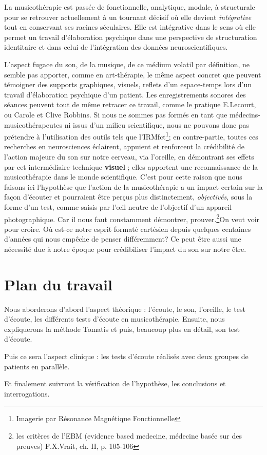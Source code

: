  La musicothérapie est passée de fonctionnelle, analytique, mo\-da\-le,  à struc\-tu\-rale pour se retrouver actuellement 
 à un tournant décisif où elle devient 
 \emph{intégrative} tout en conservant ses racines séculaires. Elle est intégrative dans le sens où elle permet un travail d'élaboration psychique dans une perspective de structuration identitaire \autocite[ch. III, p. 53, 105]{vrait_musicotherapie_2018} et dans celui de l'intégration des données neuroscientifiques.
 
  
L'aspect fugace du son, de la musique, de ce médium volatil par
définition, ne semble pas apporter, comme en art-thérapie, le
même aspect concret que peuvent témoigner des supports graphiques,
visuels, reflets d'un espace-temps lors d'un travail d'élaboration
psychique d'un patient. Les enregistrements sonores des séances peuvent tout de même retracer ce travail, comme le pratique E.Lecourt, ou Carole et Clive Robbins.
Si nous ne sommes pas formés en tant que médecins- musicothérapeutes ni issus d'un milieu scientifique, nous ne pouvons donc  pas prétendre à l'utilisation des outils
 tels que l'IRMfct\footnote{Imagerie par Résonance Magnétique Fonctionnelle}; en contre-partie, toutes ces recherches en
neurosciences éclairent, appuient et renforcent la crédibilité de l'action
majeure du son sur notre cerveau, via l'oreille, en démontrant ses effets par cet intermédiaire technique \textbf{visuel} ; elles apportent une reconnaissance de la musicothérapie dans le monde scientifique. C'est pour cette raison que nous  faisons ici l'hypothèse que l'action de la musicothérapie a un impact certain sur la façon d'écouter et pourraient être perçus plus
distinctement, \textsl{objectivés}, sous la forme d'un test, comme saisis par l'\oe il neutre de l'objectif d'un appareil
photographique.
Car il nous faut constamment démontrer, prouver.\footnote{
	les critères de l'EBM (evidence based medecine, médecine basée sur des preuves) F.X.Vrait, ch. II, p. 105-106 }On veut voir pour croire. Où est-ce notre esprit formaté cartésien depuis quelques centaines d'années qui nous empêche de penser différemment? 
Ce peut être aussi une nécessité due à notre époque pour crédibiliser l'impact du son sur notre être. 


\section{Plan du travail}

Nous aborderons d'abord l'aspect théorique : l'écoute, le son, l'oreille, le test d'écoute, les différents tests d'écoute en musicothérapie.  Ensuite, nous expliquerons  la méthode Tomatis
et puis, beaucoup plus en détail, son test d'écoute.

Puis ce sera l'aspect clinique : les tests d'écoute réalisés  avec deux groupes de patients en parallèle.

Et finalement suivront la vérification de l'hypothèse, les conclusions et interrogations. 
